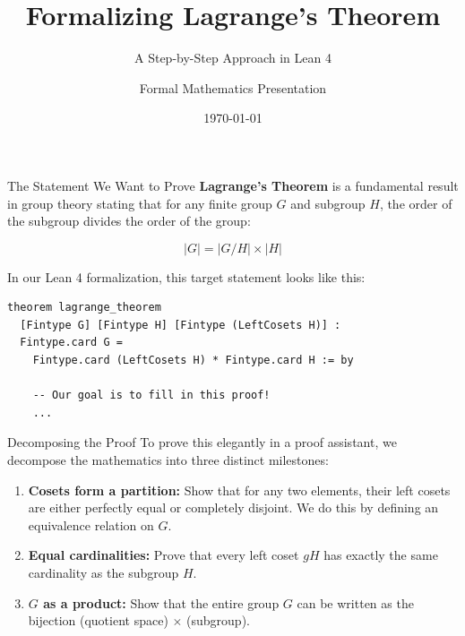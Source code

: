 \documentclass{beamer}
\title{Formalizing Lagrange's Theorem}
\subtitle{A Step-by-Step Approach in Lean 4}
\author{Formal Mathematics Presentation}
\date{\today}
\begin{document}
\begin{frame}
    \titlepage
\end{frame}

\begin{frame}[fragile]{The Statement We Want to Prove}
    \textbf{Lagrange's Theorem} is a fundamental result in group theory stating that for any finite group $G$ and subgroup $H$, the order of the subgroup divides the order of the group:
    
    \[ |G| = |G/H| \times |H| \]
    
    \vspace{0.5cm}
    In our Lean 4 formalization, this target statement looks like this:

\begin{lstlisting}
theorem lagrange_theorem 
  [Fintype G] [Fintype H] [Fintype (LeftCosets H)] :
  Fintype.card G = 
    Fintype.card (LeftCosets H) * Fintype.card H := by
    
    -- Our goal is to fill in this proof!
    ...
\end{lstlisting}
\end{frame}

\begin{frame}{Decomposing the Proof}
    To prove this elegantly in a proof assistant, we decompose the mathematics into three distinct milestones:
    
    \vspace{0.5cm}
    \begin{enumerate}
        \item \textbf{Cosets form a partition:} Show that for any two elements, their left cosets are either perfectly equal or completely disjoint. We do this by defining an equivalence relation on $G$.
        
        \vspace{0.3cm}
        \item \textbf{Equal cardinalities:} Prove that every left coset $gH$ has exactly the same cardinality as the subgroup $H$.
        
        \vspace{0.3cm}
        \item \textbf{$G$ as a product:} Show that the entire group $G$ can be written as the bijection (quotient space) $\times$ (subgroup).
    \end{enumerate}
\end{frame}
\end{document}
